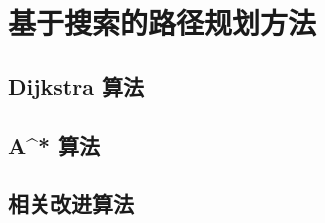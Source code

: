 \documentclass{standalone}
\begin{document}
\chapter{基于搜索的路径规划方法}
\section{Dijkstra 算法}
\section{A^{*} 算法}
\section{相关改进算法}
\end{document}
